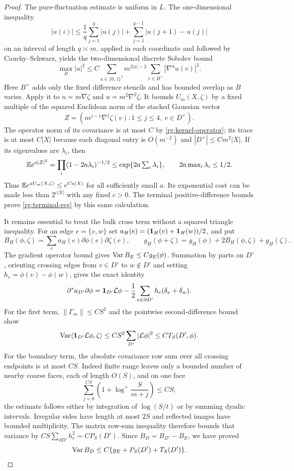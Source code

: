 \begin{proof}
The pure-fluctuation estimate is uniform in $L$.  The one-dimensional inequality
\[
 |u(i)|\le\frac1{q}\sum_{j=1}^{q}|u(j)|+\sum_{j=1}^{q-1}|u(j+1)-u(j)|
\]
on an interval of length $q\asymp m$, applied in each coordinate and followed by Cauchy--Schwarz, yields the two-dimensional discrete Sobolev bound
\[
 \max_B |u|^2\le C\sum_{a\in\{0,1\}^2}m^{2|a|-2}\sum_{v\in B^+}|\nabla^a u(v)|^2.
\]
Here $B^+$ adds only the fixed difference stencils and has bounded overlap as $B$ varies.  Apply it to $u=m\nabla\zeta$ and $u=m^2\nabla^2\zeta$.  It bounds $U_m(X,\zeta)$ by a fixed multiple of the squared Euclidean norm of the stacked Gaussian vector
\[
 Z=(m^{j-1}\nabla^j\zeta(v):1\le j\le4,\ v\in D^+).
\]
The operator norm of its covariance is at most $C$ by \eqref{rg:kernel-operator}; its trace is at most $C|X|$ because each diagonal entry is $O(m^{-2})$ and $|D^+|\le C m^2|X|$.  If its eigenvalues are $\lambda_i$, then
\[
 \mathbb E e^{a|Z|^2}=\prod_i(1-2a\lambda_i)^{-1/2}
 \le\exp\{2a\textstyle\sum_i\lambda_i\},\qquad 2a\max_i\lambda_i\le1/2.
\]
Thus $\mathbb E e^{aU_m(X,\zeta)}\le e^{Ca|X|}$ for all sufficiently small $a$.  Its exponential cost can be made less than $2^{c|X|}$ with any fixed $c>0$.  The terminal positive-difference bounds prove \eqref{rg:terminal-reg} by this same calculation.

It remains essential to treat the bulk cross term without a squared triangle inequality.  For an edge $e=\{v,w\}$ set $a_H(e)=(\mathbf 1_H(v)+\mathbf 1_H(w))/2$, and put
\[
 B_H(\phi,\zeta)=\sum_ea_H(e)\partial\phi(e)\partial\zeta(e),\qquad
 g_H(\phi+\zeta)=g_H(\phi)+2B_H(\phi,\zeta)+g_H(\zeta).
\]
The gradient operator bound gives $\operatorname{Var} B_E\le Cg_E(\phi)$.  Summation by parts on $D'$, orienting crossing edges from $v\in D'$ to $w\notin D'$ and setting $h_e=\phi(v)-\phi(w)$, gives the exact identity
\begin{equation}\label{rg:ibp}
 \partial^*a_{D'}\partial\phi
 =\mathbf 1_{D'}\mathcal L\phi-\frac12\sum_{e\in\partial D'}h_e(\delta_v+\delta_w).
\end{equation}
For the first term, $\|\Gamma_m\|\le CS^2$ and the pointwise second-difference bound show
\[
 \operatorname{Var}\langle \mathbf 1_{D'}\mathcal L\phi,\zeta\rangle
 \le CS^2\sum_{D'}|\mathcal L\phi|^2\le CT_S(D',\phi).
\]
For the boundary term, the absolute covariance row sum over all crossing endpoints is at most $CS$.  Indeed finite range leaves only a bounded number of nearby coarse faces, each of length $O(S)$, and on one face
\[
 \sum_{j=0}^{CS}\left(1+\log^+\frac{S}{m+j}\right)\le CS;
\]
the estimate follows either by integration of $\log(S/t)$ or by summing dyadic intervals.  Irregular sides have length at most $2S$ and reflected images have bounded multiplicity.  The matrix row-sum inequality therefore bounds that variance by $CS\sum_{\partial D'}h_e^2=CP_S(D')$.  Since $B_D=B_{D'}-B_E$, we have proved
\begin{equation}\label{rg:cross-variance}
 \operatorname{Var} B_D\le C\{g_E+P_S(D')+T_S(D')\}.
\end{equation}


\end{proof}
